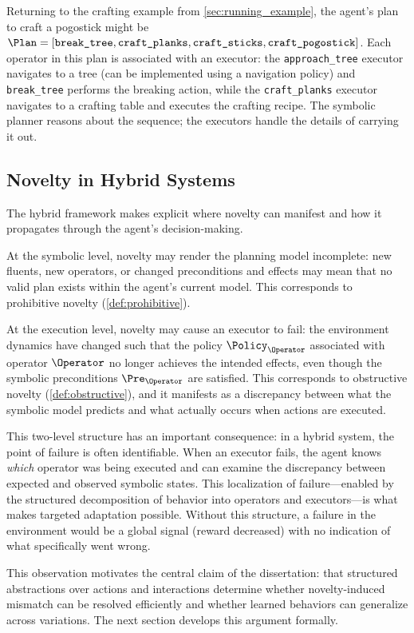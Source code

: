

Returning to the crafting example from \cref{sec:running_example}, the agent's plan to craft a pogostick might be $\Plan = [\texttt{break\_tree}, \texttt{craft\_planks}, \texttt{craft\_sticks}, \texttt{craft\_pogostick}]$. Each operator in this plan is associated with an executor: the \texttt{approach\_tree} executor navigates to a tree (can be implemented using a navigation policy) and \texttt{break\_tree} performs the breaking action, while the \texttt{craft\_planks} executor navigates to a crafting table and executes the crafting recipe. The symbolic planner reasons about the sequence; the executors handle the details of carrying it out.

\subsection{Novelty in Hybrid Systems}
\label{sec:novelty_hybrid}

The hybrid framework makes explicit where novelty can manifest and how it propagates through the agent's decision-making.

At the symbolic level, novelty may render the planning model incomplete: new fluents, new operators, or changed preconditions and effects may mean that no valid plan exists within the agent's current model. This corresponds to prohibitive novelty (\cref{def:prohibitive}).

At the execution level, novelty may cause an executor to fail: the environment dynamics have changed such that the policy $\Policy_\Operator$ associated with operator $\Operator$ no longer achieves the intended effects, even though the symbolic preconditions $\Pre_\Operator$ are satisfied. This corresponds to obstructive novelty (\cref{def:obstructive}), and it manifests as a discrepancy between what the symbolic model predicts and what actually occurs when actions are executed.

This two-level structure has an important consequence: in a hybrid system, the point of failure is often identifiable. When an executor fails, the agent knows \emph{which} operator was being executed and can examine the discrepancy between expected and observed symbolic states. This localization of failure---enabled by the structured decomposition of behavior into operators and executors---is what makes targeted adaptation possible. Without this structure, a failure in the environment would be a global signal (reward decreased) with no indication of what specifically went wrong.

This observation motivates the central claim of the dissertation: that structured abstractions over actions and interactions determine whether novelty-induced mismatch can be resolved efficiently and whether learned behaviors can generalize across variations. The next section develops this argument formally.